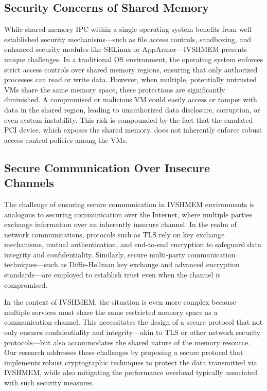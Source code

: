 \documentclass[conference]{IEEEtran}
\begin{document}
\subsection{Security Concerns of Shared Memory}
While shared memory IPC within a single operating system benefits from well-established security mechanisms—such as file access controls, sandboxing, and enhanced security modules like SELinux or AppArmor—IVSHMEM presents unique challenges. In a traditional OS environment, the operating system enforces strict access controls over shared memory regions, ensuring that only authorized processes can read or write data. However, when multiple, potentially untrusted VMs share the same memory space, these protections are significantly diminished. A compromised or malicious VM could easily access or tamper with data in the shared region, leading to unauthorized data disclosure, corruption, or even system instability. This risk is compounded by the fact that the emulated PCI device, which exposes the shared memory, does not inherently enforce robust access control policies among the VMs.


\subsection{Secure Communication Over Insecure Channels}

The challenge of ensuring secure communication in IVSHMEM environments is analogous to securing communication over the Internet, where multiple parties exchange information over an inherently insecure channel. In the realm of network communications, protocols such as TLS rely on key exchange mechanisms, mutual authentication, and end-to-end encryption to safeguard data integrity and confidentiality. Similarly, secure multi-party communication techniques—such as Diffie-Hellman key exchange and advanced encryption standards—are employed to establish trust even when the channel is compromised.

In the context of IVSHMEM, the situation is even more complex because multiple services must share the same restricted memory space as a communication channel. This necessitates the design of a secure protocol that not only ensures confidentiality and integrity—akin to TLS or other network security protocols—but also accommodates the shared nature of the memory resource. Our research addresses these challenges by proposing a secure protocol that implements robust cryptographic techniques to protect the data transmitted via IVSHMEM, while also mitigating the performance overhead typically associated with such security measures.
\end{document}
